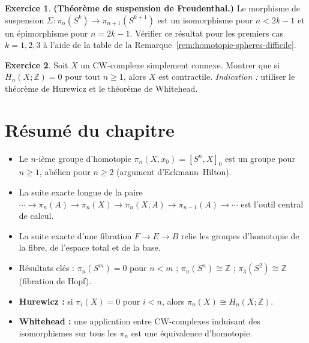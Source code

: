 \documentclass[12pt,a4paper,openany]{book}
\theoremstyle{definition}
\newtheorem{exercice}{Exercice}[chapter]
\theoremstyle{plain}
\theoremstyle{remark}
\newcommand{\Z}{\mathbb{Z}}
\begin{document}
\begin{exercice}\label{exo:homotopie-8}
  \textbf{(Théorème de suspension de Freudenthal.)}
  Le morphisme de suspension $\Sigma \colon \pi_n(S^k) \to \pi_{n+1}(S^{k+1})$
  est un isomorphisme pour $n < 2k - 1$ et un épimorphisme pour $n = 2k - 1$.
  Vérifier ce résultat pour les premiers cas $k = 1, 2, 3$ à l'aide de la table de
  la Remarque~\ref{rem:homotopie-spheres-difficile}.
\end{exercice}

\begin{exercice}\label{exo:homotopie-9}
  Soit $X$ un CW-complexe simplement connexe. Montrer que si $H_n(X; \Z) = 0$ pour
  tout $n \geq 1$, alors $X$ est contractile.
  \emph{Indication :} utiliser le théorème de Hurewicz et le théorème de Whitehead.
\end{exercice}

\section*{Résumé du chapitre}

\begin{itemize}
  \item Le $n$-ième groupe d'homotopie $\pi_n(X, x_0) = [S^n, X]_0$ est un groupe
        pour $n \geq 1$, abélien pour $n \geq 2$ (argument d'Eckmann--Hilton).
  \item La suite exacte longue de la paire
        $\cdots \to \pi_n(A) \to \pi_n(X) \to \pi_n(X, A) \to \pi_{n-1}(A) \to \cdots$
        est l'outil central de calcul.
  \item La suite exacte d'une fibration $F \to E \to B$ relie les groupes d'homotopie
        de la fibre, de l'espace total et de la base.
  \item Résultats clés : $\pi_n(S^m) = 0$ pour $n < m$ ; $\pi_n(S^n) \cong \Z$ ;
        $\pi_3(S^2) \cong \Z$ (fibration de Hopf).
  \item \textbf{Hurewicz :} si $\pi_i(X) = 0$ pour $i < n$, alors
        $\pi_n(X) \cong H_n(X; \Z)$.
  \item \textbf{Whitehead :} une application entre CW-complexes induisant des
        isomorphismes sur tous les $\pi_n$ est une équivalence d'homotopie.
\end{itemize}

\end{document}
